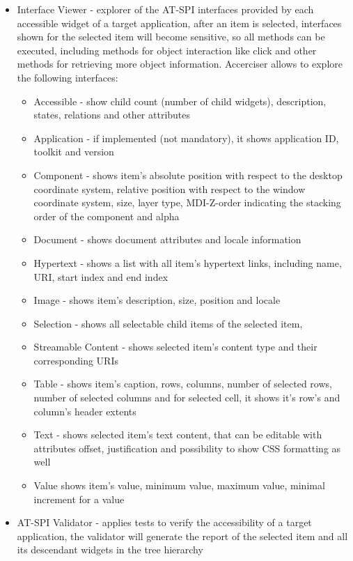 \begin{itemize}
    \item Interface Viewer - explorer of the AT-SPI interfaces provided by each accessible widget of a target application, after an item is selected, interfaces shown for the selected item will become sensitive, so all methods can be executed, including methods for object interaction like click and other methods for retrieving more object information. Accerciser allows to explore the following interfaces:
    \begin{itemize}
        \item Accessible - show child count (number of child widgets), description, states, relations and other attributes
        \item Application - if implemented (not mandatory), it shows application ID, toolkit and version
        \item Component - shows item's absolute position with respect to the desktop coordinate system, relative position with respect to the  window coordinate system, size, layer type, MDI-Z-order indicating the stacking order of the component and alpha
        \item Document - shows document attributes and locale information
        \item Hypertext - shows a list with all item's hypertext links,  including name, URI, start index and end index
        \item Image - shows item's description, size, position and locale
        \item Selection - shows all selectable child items of the selected item,
        \item Streamable Content - shows selected item's content type and their corresponding URIs
        \item Table - shows item's caption, rows, columns, number of selected rows, number of selected columns and for selected cell, it shows  it's row's and column's header extents  
        \item Text - shows selected item's text content, that can be editable with attributes offset, justification  and possibility to show CSS formatting as well
        \item Value shows item's value, minimum value, maximum value, minimal increment for a value 
    \end{itemize}
    \item AT-SPI Validator - applies tests to verify the accessibility of a target application, the validator will generate the report of the selected item and all its descendant widgets in the tree hierarchy

\end{itemize}
